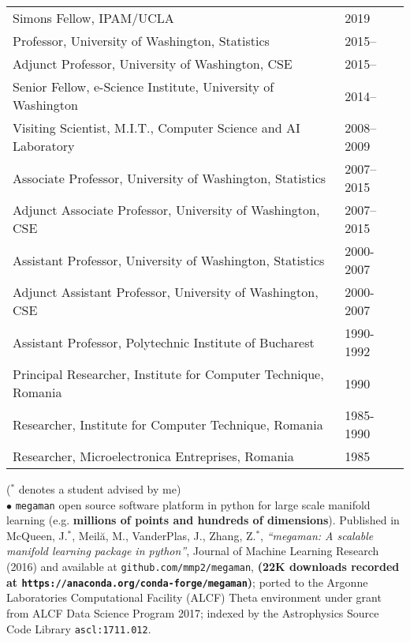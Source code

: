 \documentclass[11pt]{article}
\newcommand{\comment}[1]{}
\newcommand{\meila}{Meil\u{a}, M.}
\newcommand{\mysubtitle}[1]{\vspace{.1in}\hspace{-2em}{\bf #1\hspace{1.5em}}}
\begin{document}
\begin{tabular}{ll}
Simons Fellow, IPAM/UCLA & 2019 \\
Professor, University of Washington, Statistics                &     2015--  \\
 Adjunct Professor, University of Washington, CSE  		&    2015--   \\ 
 Senior Fellow, e-Science Institute, University of Washington	&    2014--  \\
 Visiting Scientist, M.I.T., Computer Science and AI Laboratory &    2008--2009\\
 Associate Professor, University of Washington, Statistics	&    2007--2015\\
 Adjunct Associate Professor, University of Washington, CSE  	&   2007--2015\\
 Assistant Professor, University of Washington, Statistics &    2000-2007\\
 Adjunct Assistant Professor, University of Washington, CSE &  	     2000-2007\\
 Assistant Professor, Polytechnic Institute of Bucharest &     1990-1992 \\
 Principal Researcher, Institute for Computer Technique, Romania &     1990 \\
Researcher, Institute for Computer Technique,  Romania	   &   1985-1990 \\
Researcher, Microelectronica Entreprises, Romania	   &	     1985 \\
\end{tabular}

\mysubtitle{Relevant publications and products} {\small($^*$ denotes a student advised by me)}
\\
$\bullet$ {\tt megaman} open source software platform in python for large scale manifold learning (e.g. {\bf millions of points and hundreds of dimensions}). Published in McQueen, J.$^*$, \meila, VanderPlas, J., Zhang, Z.$^*$, {\it ``megaman: A scalable manifold learning package in python''}, Journal of Machine Learning Research (2016) and available at {\tt github.com/mmp2/megaman}, {\bf  (22K downloads recorded at {\tt https://anaconda.org/conda-forge/megaman})}; ported to the Argonne Laboratories Computational Facility (ALCF) Theta environment under grant from ALCF Data Science Program 2017; indexed by the Astrophysics Source Code Library {\tt ascl:1711.012}. 
\comment{$\bullet$  \meila, {\it Good (K-means) clusterings are unique (up to
 small perturbations)}, Journal of Multivariate Analysis, 2019
\\}
\end{document}
